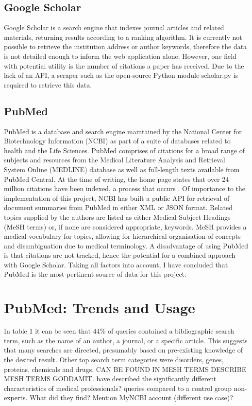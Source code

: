 \documentclass[PROP_AGutteridge_CS.tex]{subfiles}
\begin{document}
\noindent \subsection{Google Scholar}
Google Scholar is a search engine that indexes journal articles and related materials, returning results according to a ranking algorithm. It is currently not possible to retrieve the institution address or author keywords, therefore the data is not detailed enough to inform the web application alone. However, one field with potential utility is the number of citations a paper has received. Due to the lack of an API, a scraper such as the open-source Python module scholar.py\cite{scholar} is required to retrieve this data.

\noindent \subsection{PubMed}
PubMed is a database and search engine maintained by the National Center for Biotechnology Information (NCBI) as part of a suite of databases related to health and the Life Sciences. PubMed comprises of citations for a broad range of subjects and resources from the Medical Literature Analysis and Retrieval System Online (MEDLINE) database as well as full-length texts available from PubMed Central. At the time of writing, the home page\cite{pubmed} states that over 24 million citations have been indexed, a process that occurs . Of importance to the implementation of this project, NCBI has built a public API for retrieval of document summaries from PubMed in either XML or JSON format. Related topics supplied by the authors are listed as either Medical Subject Headings (MeSH terms) or, if none are considered appropriate, keywords. MeSH provides a medical vocabulary for topics, allowing for hierarchical organisation of concepts and disambiguation due to medical terminology\cite{mesh}. A disadvantage of using PubMed is that citations are not tracked, hence the potential for a combined approach with Google Scholar. Taking all factors into account, I have concluded that PubMed is the most pertinent source of data for this project.

\section{PubMed: Trends and Usage}
In table 1 it can be seen that 44\% of queries contained a bibliographic search term, such as the name of an author, a journal, or a specific article. This suggests that many searches are directed, presumably based on pre-existing knowledge of the desired result. Other top search term categories were disorders, genes, proteins, chemicals and drugs, CAN BE FOUND IN MESH TERMS DESCRIBE MESH TERMS GODDAMIT.\cite{white} have described the significantly different characteristics of medical professionals? queries compared to a control group non-experts. What did they find? Mention MyNCBI account (different use case)?
\end{document}
